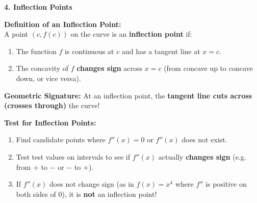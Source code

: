 \documentclass[10.5pt]{article}
\begin{document}
\vspace{0.04in}

\textbf{\large 4. Inflection Points}

\begin{tcolorbox}[colback=chalkblue!6, colframe=chalkblue, boxrule=1pt, arc=3pt, left=8pt, right=8pt, top=4pt, bottom=4pt]
\textbf{Definition of an Inflection Point:}\\[2pt]
A point $(c, f(c))$ on the curve is an \textbf{inflection point} if:
\begin{enumerate}[leftmargin=1.4em, topsep=1pt, itemsep=2pt]
  \item The function $f$ is continuous at $c$ and has a tangent line at $x=c$.
  \item The concavity of $f$ \textbf{changes sign} across $x=c$ (from concave up to concave down, or vice versa).
\end{enumerate}
\textbf{Geometric Signature:} At an inflection point, the \textbf{tangent line cuts across (crosses through)} the curve!
\end{tcolorbox}

\vspace{0.03in}

\textbf{Test for Inflection Points:}
\begin{enumerate}[leftmargin=1.2em, topsep=1pt, itemsep=2pt]
  \item Find candidate points where $f''(x) = 0$ or $f''(x)$ does not exist.
  \item Test test values on intervals to see if $f''(x)$ actually \textbf{changes sign} (e.g. from $+$ to $-$ or $-$ to $+$).
  \item If $f''(x)$ does not change sign (as in $f(x)=x^4$ where $f''$ is positive on both sides of $0$), it is \textbf{not} an inflection point!
\end{enumerate}
\end{document}

